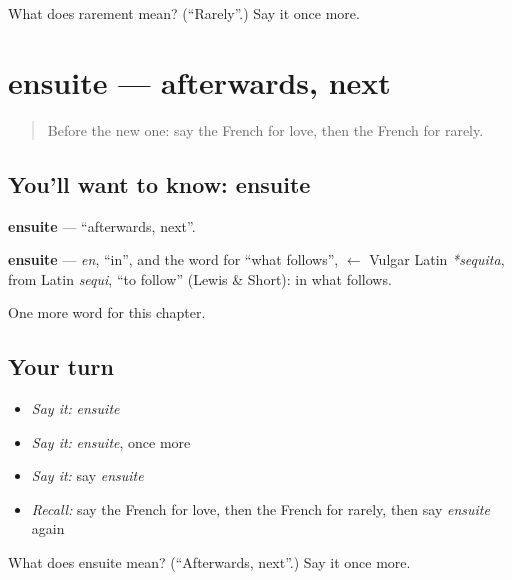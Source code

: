 \begin{tcolorbox}[breakable,colback=teal!4,colframe=teal!35!black,title={Before you move on}]
What does rarement mean? (\textquotedblleft{}Rarely\textquotedblright{}.) Say it once more.
\end{tcolorbox}
\section[ensuite]{ensuite — afterwards, next}

\label{lesson:FR-C156-ensuite}



\begin{quote}
Before the new one: say the French for love, then the French for rarely.
\end{quote}

\subsection*{You'll want to know: ensuite}
\textbf{ensuite} — \textquotedblleft{}afterwards, next\textquotedblright{}.

\begin{cousinweb}
\textbf{ensuite} — \emph{en}, \textquotedblleft{}in\textquotedblright{}, and the word for \textquotedblleft{}what follows\textquotedblright{}, $\leftarrow$ Vulgar Latin \emph{*sequita}, from Latin \emph{sequi}, \textquotedblleft{}to follow\textquotedblright{} (Lewis \& Short): in what follows.
\end{cousinweb}

\begin{grammarlens}[title={What you've built}]
One more word for this chapter.
\end{grammarlens}

\subsection*{Your turn}
\begin{itemize}
\raggedright
  \item \emph{Say it:} \emph{ensuite}
  \item \emph{Say it:} \emph{ensuite}, once more
  \item \emph{Say it:} say \emph{ensuite}
  \item \emph{Recall:} say the French for love, then the French for rarely, then say \emph{ensuite} again
\end{itemize}

\begin{tcolorbox}[breakable,colback=teal!4,colframe=teal!35!black,title={Before you move on}]
What does ensuite mean? (\textquotedblleft{}Afterwards, next\textquotedblright{}.) Say it once more.
\end{tcolorbox}
